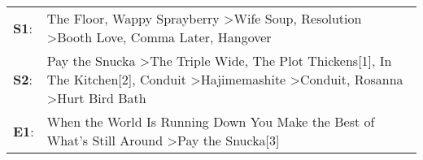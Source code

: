 \begin{supertabular}{p{0.03\textwidth}p{0.92\textwidth}}
 \textbf{S1}:  &                                                                                                                             The Floor\textsuperscript{}, \enspace Wappy Sprayberry\textsuperscript{} \textgreater \enspace Wife Soup\textsuperscript{}, \enspace Resolution\textsuperscript{} \textgreater \enspace Booth Love\textsuperscript{}, \enspace Comma Later\textsuperscript{}, \enspace Hangover\textsuperscript{}  \enspace  \\
 \textbf{S2}:  &  Pay the Snucka\textsuperscript{} \textgreater \enspace The Triple Wide\textsuperscript{}, \enspace The Plot Thickens[1]\textsuperscript{}, \enspace In The Kitchen[2]\textsuperscript{}, \enspace Conduit\textsuperscript{} \textgreater \enspace Hajimemashite\textsuperscript{} \textgreater \enspace Conduit\textsuperscript{}, \enspace Rosanna\textsuperscript{} \textgreater \enspace Hurt Bird Bath\textsuperscript{}  \enspace  \\
 \textbf{E1}:  &                                                                                                                                                                                                                                                                           When the World Is Running Down You Make the Best of What's Still Around\textsuperscript{} \textgreater \enspace Pay the Snucka[3]\textsuperscript{}  \enspace  \\
\end{supertabular}
